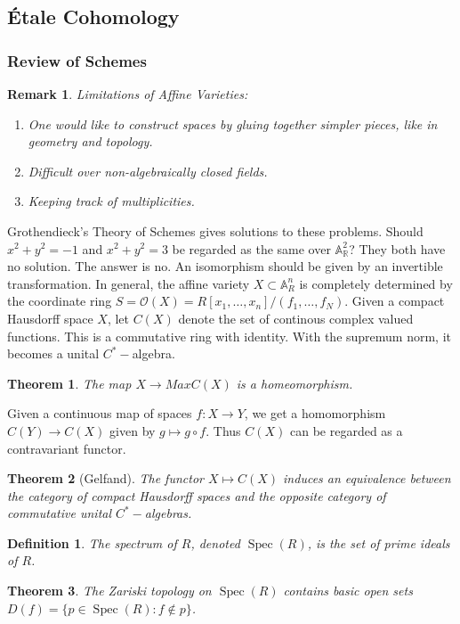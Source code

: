\documentclass{article}
\theoremstyle{mystyle}
\newtheorem{theorem}{Theorem}[section]
\newtheorem{definition}{Definition}[section]
\newtheorem{remark}{Remark}[section]
\DeclareMathOperator{\Spec}{Spec}
\begin{document}
\subsection{\'{E}tale Cohomology}
\subsubsection{Review of Schemes}
\begin{remark}
Limitations of Affine Varieties:
\begin{enumerate}
    \item One would like to construct spaces by gluing together simpler pieces, like in geometry and topology.
    \item Difficult over non-algebraically closed fields.
    \item Keeping track of multiplicities.
\end{enumerate}
\end{remark}
Grothendieck's Theory of Schemes gives solutions to these problems. Should $x^2+y^2 = -1$ and $x^2+y^2 = 3$ be regarded as the same over $\mathbb{A}_{\mathbb{R}}^2$? They both have no solution. The answer is no. An isomorphism should be given by an invertible transformation. In general, the affine variety $X\subset \mathbb{A}_{R}^n$ is completely determined by the coordinate ring $S = \mathcal{O}(X) = R[x_1,\hdots, x_n]/(f_1,\hdots, f_N)$. Given a compact Hausdorff space $X$, let $C(X)$ denote the set of continous complex valued functions. This is a commutative ring with identity. With the supremum norm, it becomes a unital $C^{*}-$algebra.
\begin{theorem}
The map $X\rightarrow MaxC(X)$ is a homeomorphism.
\end{theorem}
Given a continuous map of spaces $f:X\rightarrow Y$, we get a homomorphism $C(Y)\rightarrow C(X)$ given by $g\mapsto g\circ f$. Thus $C(X)$ can be regarded as a contravariant functor. 
\begin{theorem}[Gelfand]
The functor $X\mapsto C(X)$ induces an equivalence between the category of compact Hausdorff spaces and the opposite category of commutative unital $C^{*}-$algebras.
\end{theorem}
\begin{definition}
The spectrum of $R$, denoted $\Spec(R)$, is the set of prime ideals of $R$.
\end{definition}
\begin{theorem}
The Zariski topology on $\Spec(R)$ contains basic open sets $D(f) = \{p\in \Spec(R): f\notin p\}$.
\end{theorem}
\end{document}
